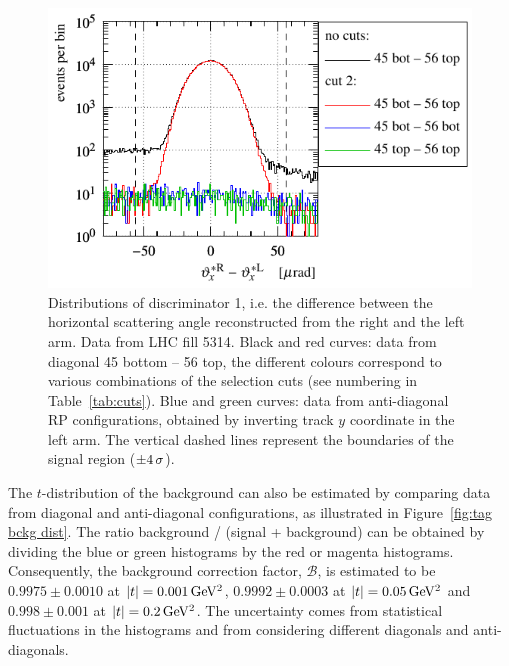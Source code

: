 \begin{figure}
\begin{center}
\includegraphics{fig/cut_dist_antidgn_cmp.pdf}
\caption{%
Distributions of discriminator 1, i.e. the difference between the horizontal scattering angle reconstructed from the right and the left arm. Data from LHC fill 5314. Black and red curves: data from diagonal 45 bottom -- 56 top, the different colours correspond to various combinations of the selection cuts (see numbering in Table~\ref{tab:cuts}). Blue and green curves: data from anti-diagonal RP configurations, obtained by inverting track $y$ coordinate in the left arm. The vertical dashed lines represent the boundaries of the signal region ($\pm 4\,{\rm \sigma}$).
}
\label{fig:tag bckg integ}
\end{center}
\end{figure}

The $t$-distribution of the background can also be estimated by comparing data from diagonal and anti-diagonal configurations, as illustrated in Figure~\ref{fig:tag bckg dist}. The ratio background / (signal + background) can be obtained by dividing the blue or green histograms by the red or magenta histograms. Consequently, the background correction factor, $\mathcal{B}$, is estimated to be $0.9975 \pm 0.0010$ at $|t| = 0.001\,{\rm GeV^2}$, $0.9992 \pm 0.0003$ at $|t| = 0.05\,{\rm GeV^2}$ and $0.998 \pm 0.001$ at $|t| = 0.2\,{\rm GeV^2}$. The uncertainty comes from statistical fluctuations in the histograms and from considering different diagonals and anti-diagonals.


